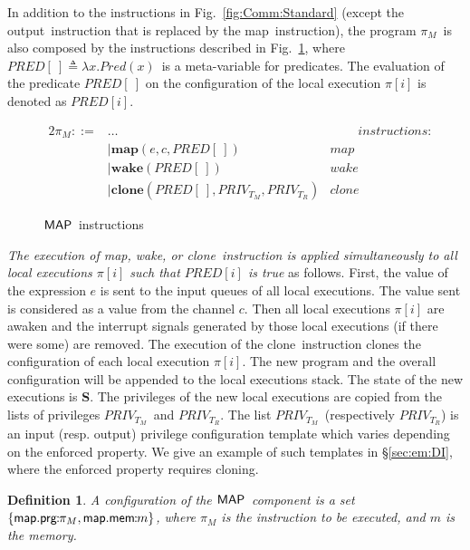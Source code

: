 \documentclass[10pt,a4paper,oneside]{article}
\newtheorem{definition}{Definition}[section]
\def\ProgM{\ensuremath{\Prog_{M}}}
\def\sS{\textbf{S}}
\def\chnl{\ensuremath{c}}
\def\lpair#1#2{#1\!\!:\!\!\ensuremath{#2}}
\def\sanserif#1{\ensuremath{\sf #1}}
\def\MAP{\ensuremath{\sanserif{MAP}}}
\def\Prog{\ensuremath{\pi}}
\def\Progl#1{\ensuremath{\Prog[#1]}}
\def\comm{\ensuremath{\pi}}
\def\commM{\ensuremath{\comm_M}}
\def\NOUTPUT{output}
\def\NMAP{map}
\def\NCLONE{clone}
\def\NWAKE{wake}
\def\imap#1#2#3{\ensuremath{\textbf{\NMAP}(#1, #2,#3)}}
\def\iclone#1#2#3{\ensuremath{\textbf{\NCLONE}(#1,#2,#3)}}
\def\iwaker#1{\ensuremath{\textbf{\NWAKE}(#1)}}
\def\spaceIns{~~~~~~~~~~}
\def\NPRED{\ensuremath{PRED}}
\def\emptyPlace{\ensuremath{[\ ]}}
\def\PREDD{\ensuremath{\NPRED\emptyPlace}}
\def\PREDE#1{\ensuremath{\NPRED[#1]}}
\def\Pred#1{\ensuremath{Pred(#1)}}
\def\lprogm{{\sf prg}}
\def\lmem{{\sf mem}}
\def\lmap{{\sf map}}
\def\tcolm{\ensuremath{PRIV_{T_M}}}
\def\tcolr{\ensuremath{PRIV_{T_R}}}
\begin{document}
In addition to the instructions in Fig.~\ref{fig:Comm:Standard} (except the \NOUTPUT\ instruction that is replaced by the \NMAP\ instruction), the program \ProgM\ is also composed by the instructions described in Fig.~\ref{fig:Comm:MAP}, where $\PREDD \triangleq \lambda x. \Pred{x}$\ is a meta-variable for predicates. The evaluation of the predicate \PREDE{\ } on the configuration of the local execution \Progl{i} is denoted as \PREDE{i}.

\begin{figure}
\begin{center}
\begin{alignat*}{2}
		\commM ::=&\dots &  \spaceIns instructions:\\
		& |\imap{e}{\chnl}{\PREDD} & \NMAP\\
		& |\iwaker{\PREDD} & \NWAKE \\
		& |\iclone{\PREDD}{\tcolm}{\tcolr} & \NCLONE
\end{alignat*}
\vspace{-10pt}
\caption{\MAP\ instructions}
\label{fig:Comm:MAP}
\end{center}
\end{figure}


\emph{The execution of \NMAP, \NWAKE, or \NCLONE\ instruction is applied simultaneously to all local executions \Progl{i} such that \PREDE{i} is true} as follows. First, the value of the expression $e$ is sent to the input queues of all local executions. The value sent is considered as a value from the channel \chnl. Then all local executions $\Prog[i]$ are awaken and the interrupt signals generated by those local executions (if there were some) are removed. The execution of the \NCLONE\ instruction clones the configuration of each local execution \Progl{i}. The new program and the overall configuration will be appended to the local executions stack. The state of the new executions is \sS. The privileges of the new local executions are copied from the lists of privileges \tcolm\ and \tcolr. The list \tcolm\ (respectively \tcolr) is an input (resp. output) privilege configuration template which varies depending on the enforced property. We give an example of such templates in \S\ref{sec:em:DI}, where the enforced property requires cloning.


\begin{definition}\label{def:confMAP}
A configuration of the \MAP\ component is a set $\{\lmap.\lpair{\lprogm}{\commM}, \lmap.\lpair{\lmem}{m}\}$, where $\comm_M$ is the instruction to be executed, and $m$ is the memory.
\end{definition}
\end{document}
